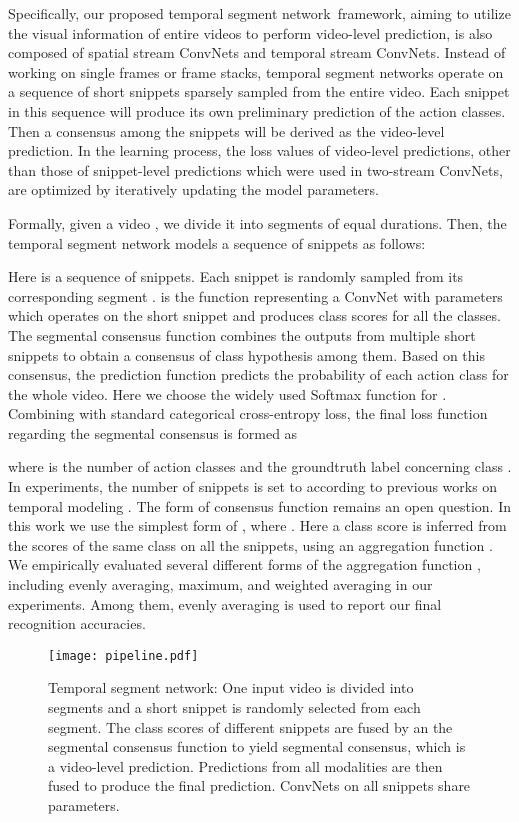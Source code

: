 \documentclass[runningheads]{llncs}
\newcommand{\SEGNET}{temporal segment network}
\begin{document}
Specifically, our proposed \SEGNET~framework, aiming to utilize the visual information of entire videos to perform video-level prediction, is also composed of spatial stream ConvNets and temporal stream ConvNets. 
Instead of working on single frames or frame stacks, \SEGNET s operate on a sequence of short snippets sparsely sampled from the entire video.
Each snippet in this sequence will produce its own preliminary prediction of the action classes.
Then a consensus among the snippets will be derived as the video-level prediction.
In the learning process, the loss values of video-level predictions, 
other than those of snippet-level predictions which were used in two-stream ConvNets, are optimized by iteratively updating the model parameters.

Formally, given a video , we divide it into  segments  of equal durations. Then, the temporal segment network models a sequence of snippets as follows:

Here  is a sequence of snippets. Each snippet  is randomly sampled from its corresponding segment .  is the function representing a ConvNet with parameters  which operates on the short snippet  and produces class scores for all the classes.
The segmental consensus function  combines the outputs from multiple short snippets to obtain a consensus of class hypothesis among them. 
Based on this consensus, the prediction function  predicts the probability of each action class for the whole video.
Here we choose the widely used Softmax function for . Combining with standard categorical cross-entropy loss, the final loss function regarding the segmental consensus  is formed as

where  is the number of action classes and  the groundtruth label concerning class .
In experiments, the number of snippets  is set to  according to previous works on temporal modeling \cite{GaidonHS13,WangQT14a}. 
The form of consensus function  remains an open question. 
In this work we use the simplest form of , where . 
Here a class score  is inferred from the scores of the same class on all the snippets, using an aggregation function .
We empirically evaluated several different forms of the aggregation function , including evenly averaging, maximum, and weighted averaging in our experiments.
Among them, evenly averaging is used to report our final recognition accuracies.

\begin{figure}[t]
	\centering
	\texttt{[image: pipeline.pdf]}
	\caption{Temporal segment network: One input video is divided into  segments and a short snippet is randomly selected from each segment. The class scores of different snippets are fused by an the segmental consensus function to yield segmental consensus, which is a video-level prediction. Predictions from all modalities are then fused to produce the final prediction. ConvNets on all snippets share parameters.}
	\label{fig:pipeline}
\end{figure}
\end{document}
